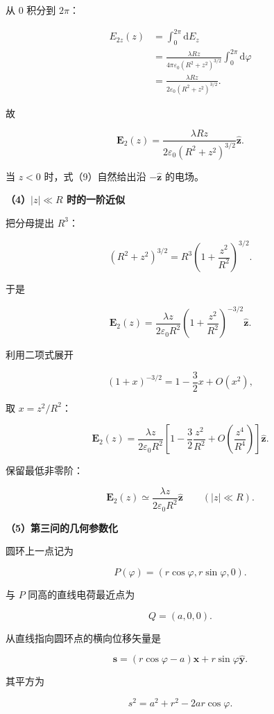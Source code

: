 \documentclass[12pt,a4paper,UTF8]{ctexart}
\begin{document}
从 \(0\) 积分到 \(2\pi\)：

\[
\begin{aligned}
E_{2z}(z)
&=\int_0^{2\pi}\mathrm dE_z\\
&=\frac{\lambda Rz}{4\pi\varepsilon_0(R^2+z^2)^{3/2}}
\int_0^{2\pi}\mathrm d\varphi\\
&=\frac{\lambda Rz}{2\varepsilon_0(R^2+z^2)^{3/2}}.
\end{aligned}
\]

故

\[
\boxed{
\boldsymbol E_2(z)
=\frac{\lambda Rz}{2\varepsilon_0(R^2+z^2)^{3/2}}
\hat{\boldsymbol z}
}.
\tag{9}
\]

当 \(z<0\) 时，式（9）自然给出沿 \(-\hat{\boldsymbol z}\) 的电场。

\textbf{（4）\(|z|\ll R\) 时的一阶近似}

把分母提出 \(R^3\)：

\[
(R^2+z^2)^{3/2}
=R^3\left(1+\frac{z^2}{R^2}\right)^{3/2}.
\tag{10}
\]

于是

\[
\boldsymbol E_2(z)
=\frac{\lambda z}{2\varepsilon_0R^2}
\left(1+\frac{z^2}{R^2}\right)^{-3/2}
\hat{\boldsymbol z}.
\tag{11}
\]

利用二项式展开

\[
(1+x)^{-3/2}
=1-\frac32x+O(x^2),
\tag{12}
\]

取 \(x=z^2/R^2\)：

\[
\boldsymbol E_2(z)
=\frac{\lambda z}{2\varepsilon_0R^2}
\left[
1-\frac32\frac{z^2}{R^2}
+O\!\left(\frac{z^4}{R^4}\right)
\right]\hat{\boldsymbol z}.
\tag{13}
\]

保留最低非零阶：

\[
\boxed{
\boldsymbol E_2(z)
\simeq\frac{\lambda z}{2\varepsilon_0R^2}
\hat{\boldsymbol z}
\qquad(|z|\ll R)
}.
\tag{14}
\]

\textbf{（5）第三问的几何参数化}

圆环上一点记为

\[
P(\varphi)
=(r\cos\varphi,r\sin\varphi,0).
\tag{15}
\]

与 \(P\) 同高的直线电荷最近点为

\[
Q=(a,0,0).
\]

从直线指向圆环点的横向位移矢量是

\[
\boldsymbol s
=(r\cos\varphi-a)\hat{\boldsymbol x}
+r\sin\varphi\hat{\boldsymbol y}.
\tag{16}
\]

其平方为

\[
s^2
=a^2+r^2-2ar\cos\varphi.
\tag{17}
\]
\end{document}
